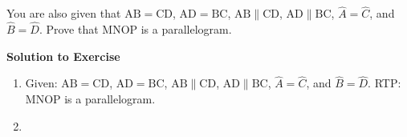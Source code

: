 {\begin{mdframed}[linewidth=4, leftmargin=40, rightmargin=40]
\begin{exercise}
You are also given that \begin{math}\mathrm{AB}=\mathrm{CD}\end{math}, \begin{math}\mathrm{AD}=\mathrm{BC}\end{math}, \begin{math}\mathrm{AB}\parallel \mathrm{CD}\end{math}, \begin{math}\mathrm{AD}\parallel \mathrm{BC}\end{math},  \begin{math}\hat{A}=\hat{C}\end{math}, and \begin{math}\hat{B}=\hat{D}\end{math}. 
Prove that MNOP is a parallelogram.\par 
\vspace{5pt}
\label{m39352*solfhsst!!!underscore!!!id023}\noindent\textbf{Solution to Exercise }\label{m39352*id085424}\begin{enumerate}[noitemsep, label=\textbf{Step} \textbf{\arabic*}. ] 
            \leftskip=20pt\rightskip=\leftskip\item Given: \begin{math}\mathrm{AB}=\mathrm{CD}\end{math}, \begin{math}\mathrm{AD}=\mathrm{BC}\end{math}, \begin{math}\mathrm{AB}\parallel \mathrm{CD}\end{math}, \begin{math}\mathrm{AD}\parallel \mathrm{BC}\end{math},  \begin{math}\hat{A}=\hat{C}\end{math}, and \begin{math}\hat{B}=\hat{D}\end{math}. RTP: MNOP is a parallelogram.\item 





\end{enumerate}
\end{exercise}
\end{mdframed}}
